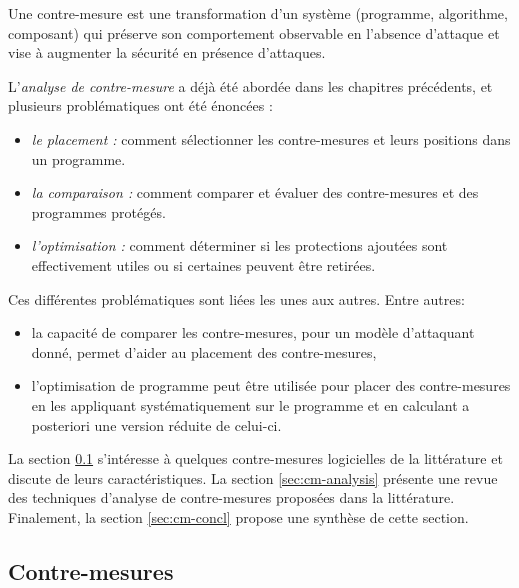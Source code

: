         \begin{defi}
            \label{def:countermeasure}
            Une contre-mesure est une transformation d'un système (programme, algorithme, composant) qui préserve son comportement observable en l'absence d'attaque et vise à augmenter la sécurité en présence d'attaques.
        \end{defi}
                
        L'\textit{analyse de contre-mesure} a déjà été abordée dans les chapitres précédents, et plusieurs problématiques ont été énoncées :
        \begin{itemize}
            \item \textit{le placement :} comment sélectionner les contre-mesures et leurs positions dans un programme.
            \item \textit{la comparaison :} comment comparer et évaluer des contre-mesures et des programmes protégés.
            \item \textit{l'optimisation :} comment déterminer si les protections ajoutées sont effectivement utiles ou si certaines peuvent être retirées.
        \end{itemize}
        
        Ces différentes problématiques sont liées les unes aux autres. Entre autres:
        \begin{itemize}
            \item la capacité de comparer les contre-mesures, pour un modèle d'attaquant donné, permet d'aider au placement des contre-mesures,
            \item l'optimisation de programme peut être utilisée pour placer des contre-mesures en les appliquant systématiquement sur le programme et en calculant a posteriori une version réduite de celui-ci.
        \end{itemize}
        
        La section \ref{sec:cm-soa} s'intéresse à quelques contre-mesures logicielles de la littérature et discute de leurs caractéristiques.
        La section \ref{sec:cm-analysis} présente une revue des techniques d'analyse de contre-mesures proposées dans la littérature.
        Finalement, la section \ref{sec:cm-concl} propose une synthèse de cette section.

        \subsection{Contre-mesures}
        \label{sec:cm-soa}
        
